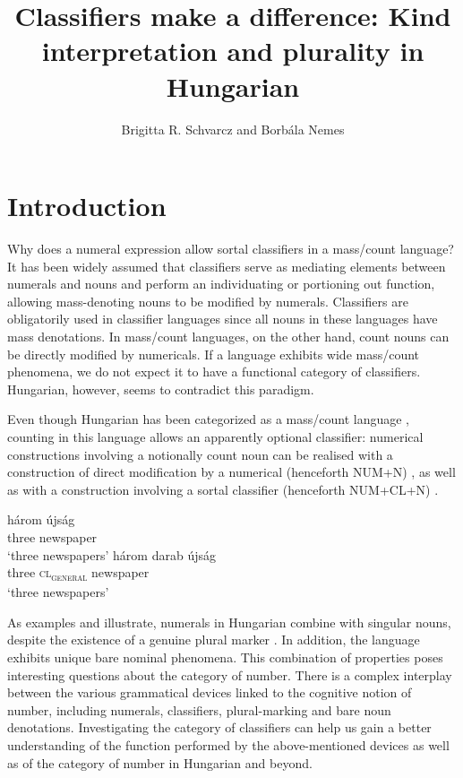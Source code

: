 \documentclass[output=paper]{langscibook}
\author{Brigitta R. Schvarcz \affiliation{Bar-Ilan University; Afeka College of Engineering} and  Borbála Nemes\affiliation{Babeș-Bolyai University}}
\title[Classifiers make a difference]{Classifiers make a difference: Kind interpretation and plurality in Hungarian}
\begin{document}
\maketitle

\section{Introduction}

Why does a numeral expression allow sortal classifiers in a mass/count language? It has been widely assumed that classifiers serve as mediating elements between numerals and nouns and perform an individuating or portioning out function, allowing mass-denoting nouns to be modified by numerals.  Classifiers are obligatorily used in classifier languages since all nouns in these languages have mass denotations. In mass/count languages, on the other hand, count nouns can be directly modified by numericals. If a language exhibits wide mass/count phenomena, we do not expect it to have a functional category of classifiers. Hungarian, however, seems to contradict this paradigm.

Even though Hungarian has been categorized as a mass/count language  \linebreak\citep{schvarcz-14, schvarcz-rothstein-17}, counting in this language allows an apparently optional classifier: numerical constructions involving a notionally count noun can be realised with a construction of direct modification by a numerical (henceforth NUM+N) , as well as with a construction involving a sortal classifier (henceforth NUM+CL+N) . 

\ea \label{schv-nem:ex:1}
\ea \label{schv-nem:ex:1a}
\gll három  újság\\  
     three newspaper\\ 
\glt `three newspapers'
\ex \label{schv-nem:ex:1b}
\gll három darab újság\\
    three \textsc{cl\textsubscript{general}} newspaper\\
\glt `three newspapers'
\z
\z

\noindent As examples  and  illustrate, numerals in Hungarian combine with singular nouns, despite the existence of a genuine plural marker \citep{schvarcz-rothstein-17}.  In addition, the language exhibits unique bare nominal phenomena. This combination of properties poses interesting questions about the category of number. There is a complex interplay between the various grammatical devices linked to the cognitive notion of number, including numerals, classifiers, plural-marking and bare noun denotations. Investigating the category of classifiers can help us gain a better understanding of the function performed by the above-mentioned devices as well as of the category of number in Hungarian and beyond.
\end{document}
